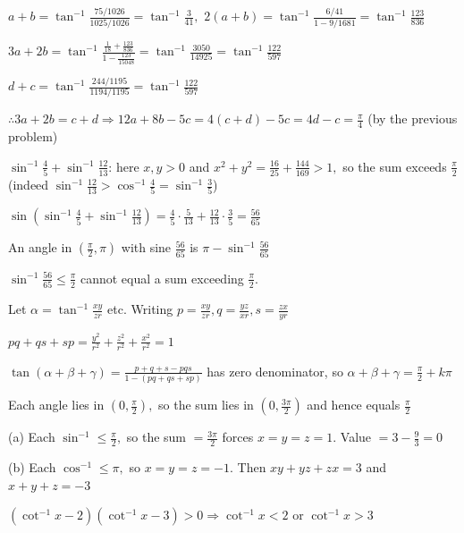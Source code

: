   $a + b = \tan^{-1}\frac{75/1026}{1025/1026} = \tan^{-1}\frac{3}{41},$ $2(a + b) = \tan^{-1}\frac{6/41}{1 - 9/1681} =
  \tan^{-1}\frac{123}{836}$

  $3a + 2b = \tan^{-1}\frac{\frac{1}{18} + \frac{123}{836}}{1 - \frac{123}{15048}} = \tan^{-1}\frac{3050}{14925} =
  \tan^{-1}\frac{122}{597}$

  $d + c = \tan^{-1}\frac{244/1195}{1194/1195} = \tan^{-1}\frac{122}{597}$

  $\therefore 3a + 2b = c + d \Rightarrow 12a + 8b - 5c = 4(c + d) - 5c = 4d - c = \frac{\pi}{4}$ (by the previous problem)

\item $\sin^{-1}\frac{4}{5} + \sin^{-1}\frac{12}{13}$: here $x, y > 0$ and $x^2 + y^2 = \frac{16}{25} + \frac{144}{169} > 1,$
  so the sum exceeds $\frac{\pi}{2}$ (indeed $\sin^{-1}\frac{12}{13} > \cos^{-1}\frac{4}{5} = \sin^{-1}\frac{3}{5}$)

  $\sin\left(\sin^{-1}\frac{4}{5} + \sin^{-1}\frac{12}{13}\right) = \frac{4}{5}\cdot\frac{5}{13} + \frac{12}{13}\cdot\frac{3}{5}
  = \frac{56}{65}$

  An angle in $\left(\frac{\pi}{2}, \pi\right)$ with sine $\frac{56}{65}$ is $\pi - \sin^{-1}\frac{56}{65}$

  $\sin^{-1}\frac{56}{65}\leq \frac{\pi}{2}$ cannot equal a sum exceeding $\frac{\pi}{2}.$

\item Let $\alpha = \tan^{-1}\frac{xy}{zr}$ etc. Writing $p = \frac{xy}{zr}, q = \frac{yz}{xr}, s = \frac{zx}{yr}$

  $pq + qs + sp = \frac{y^2}{r^2} + \frac{z^2}{r^2} + \frac{x^2}{r^2} = 1$

  $\tan(\alpha + \beta + \gamma) = \frac{p + q + s - pqs}{1 - (pq + qs + sp)}$ has zero denominator, so $\alpha + \beta + \gamma
  = \frac{\pi}{2} + k\pi$

  Each angle lies in $\left(0, \frac{\pi}{2}\right),$ so the sum lies in $\left(0, \frac{3\pi}{2}\right)$ and hence equals
  $\frac{\pi}{2}$

\item (a) Each $\sin^{-1}\leq \frac{\pi}{2},$ so the sum $= \frac{3\pi}{2}$ forces $x = y = z = 1.$ Value $= 3 - \frac{9}{3} = 0$

  (b) Each $\cos^{-1}\leq \pi,$ so $x = y = z = -1.$ Then $xy + yz + zx = 3$ and $x + y + z = -3$

\item $(\cot^{-1}x - 2)(\cot^{-1}x - 3) > 0 \Rightarrow \cot^{-1}x < 2$ or $\cot^{-1}x > 3$

